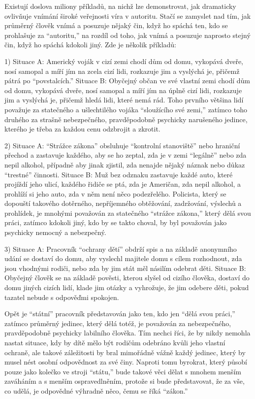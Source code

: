 \documentclass{book}
\begin{document}
Existují doslova miliony příkladů, na nichž lze demonstrovat, jak dramaticky ovlivňuje vnímání široké veřejnosti víra v autoritu. Stačí se zamyslet nad tím, jak průměrný člověk vnímá a posuzuje nějaký čin, když ho spáchá ten, kdo se prohlašuje za \enquote{autoritu,} na rozdíl od toho, jak vnímá a posuzuje naprosto stejný čin, když ho spáchá kdokoli jiný. Zde je několik příkladů:

1) Situace A: Americký voják v cizí zemi chodí dům od domu, vykopává dveře, nosí samopal a míří jím na zcela cizí lidi, rozkazuje jim a vyslýchá je, přičemž pátrá po \enquote{povstalcích.} Situace B: Obyčejný občan ve své vlastní zemi chodí dům od domu, vykopává dveře, nosí samopal a míří jím na úplně cizí lidi, rozkazuje jim a vyslýchá je, přičemž hledá lidi, které nemá rád. Toho prvního většina lidí považuje za statečného a ušlechtilého vojáka \enquote{sloužícího své zemi,} zatímco toho druhého za strašně nebezpečného, pravděpodobně psychicky narušeného jedince, kterého je třeba za každou cenu odzbrojit a zkrotit.

2) Situace A: \enquote{Strážce zákona} obsluhuje \enquote{kontrolní stanoviště} nebo hraniční přechod a zastavuje každého, aby se ho zeptal, zda je v zemi \enquote{legálně} nebo zda nepil alkohol, případně aby jinak zjistil, zda nenajde nějaký náznak nebo důkaz \enquote{trestné} činnosti. Situace B: Muž bez odznaku zastavuje každé auto, které projíždí jeho ulicí, každého řidiče se ptá, zda je Američan, zda nepil alkohol, a prohlíží si jeho auto, zda v něm není něco podezřelého. Policista, který se dopouští takového dotěrného, nepříjemného obtěžování, zadržování, výslechů a prohlídek, je mnohými považován za statečného \enquote{strážce zákona,} který dělá svou práci, zatímco kdokoli jiný, kdo by se takto choval, by byl považován jako psychicky nemocný a nebezpečný.

3) Situace A: Pracovník \enquote{ochrany dětí} obdrží spis a na základě anonymního udání se dostaví do domu, aby vyslechl majitele domu s cílem rozhodnout, zda jsou vhodnými rodiči, nebo zda by jim stát měl násilím odebrat děti. Situace B: Obyčejný člověk se na základě pověsti, kterou slyšel od cizího člověka, dostaví do domu jiných cizích lidí, klade jim otázky a vyhrožuje, že jim odebere děti, pokud tazatel nebude s odpověďmi spokojen.

Opět je \enquote{státní} pracovník představován jako ten, kdo jen \enquote{dělá svou práci,} zatímco průměrný jedinec, který dělá totéž, je považován za nebezpečného, pravděpodobně psychicky labilního člověka. Tím nechci říci, že by nikdy nemohla nastat situace, kdy by dítě mělo být rodičům odebráno kvůli jeho vlastní ochraně, ale takové záležitosti by bral mimořádně vážně každý jedinec, který by musel nést osobní odpovědnost za své činy. Naproti tomu byrokrat, který působí pouze jako kolečko ve stroji \enquote{státu,} bude takové věci dělat s mnohem menším zaváháním a s menším ospravedlněním, protože si bude představovat, že za vše, co udělá, je odpovědné výhradně něco, čemu se říká \enquote{zákon.}
\end{document}

